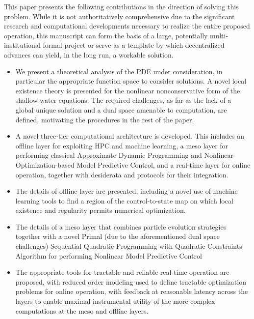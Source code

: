 \documentclass{article}
\newcommand{\1}{\mathds{1}}          %
\theoremstyle{definition}
\begin{document}
\begin{sloppypar}
This paper presents the following contributions in the direction of solving this problem. While it is not authoritatively comprehensive due to the significant research and computational developments necessary to realize the entire proposed operation, this manuscript can form the basis of a large, potentially multi-institutional formal project or serve as a template by which decentralized advances can yield, in the long run, a workable solution. 
\begin{itemize}
    \item We present a theoretical analysis of the PDE under consideration, in particular the appropriate function space to consider solutions. A novel local existence theory is presented for the nonlinear nonconservative form of the shallow water equations. The required challenges, as far as the lack of a global unique solution and a dual space amenable to computation, are defined, motivating the procedures in the rest of the paper.
    \item A novel three-tier computational architecture is developed. This includes an offline layer for exploiting HPC and machine learning, a meso layer for performing classical Approximate Dynamic Programming and Nonlinear-Optimization-based Model Predictive Control, and a real-time layer for online operation, together with desiderata and protocols for their integration.
    \item The details of offline layer are presented, including a novel use of machine learning tools to find a region of the control-to-state map on which local existence and regularity permits numerical optimization.
    \item The details of a meso layer that combines particle evolution strategies together with a novel Primal (due to the aforementioned dual space challenges) Sequential Quadratic Programming with Quadratic Constraints Algorithm for performing Nonlinear Model Predictive Control
    \item The appropriate tools for tractable and reliable real-time operation are proposed, with reduced order modeling used to define tractable optimization problems for online operation, with feedback at reasonable latency across the layers to enable maximal instrumental utility of the more complex computations at the meso and offline layers.
\end{itemize}


\end{sloppypar}
\end{document}
